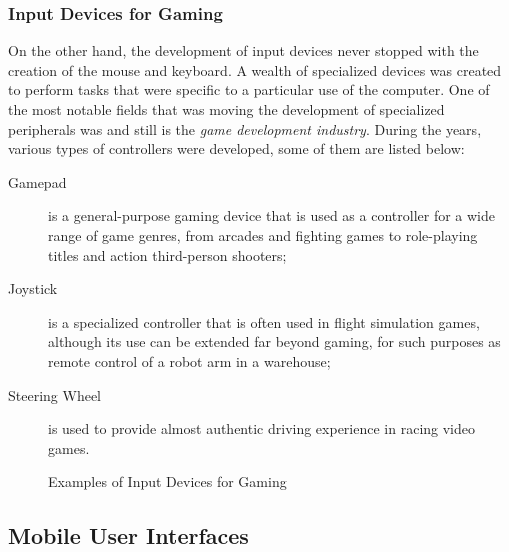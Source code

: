 \subsubsection{Input Devices for Gaming}

On the other hand, the development of input devices never stopped with the
creation of the mouse and keyboard. A wealth of specialized devices was
created to perform tasks that were specific to a particular use of the
computer. One of the most notable fields that was moving the development of
specialized peripherals was and still is the \emph{game development industry}.
During the years, various types of controllers were developed, some of them
are listed below:

\begin{description}

    \item [Gamepad] is a general-purpose gaming device that is used as a
        controller for a wide range of game genres, from arcades and fighting
        games to role-playing titles and action third-person shooters;

    \item [Joystick] is a specialized controller that is often used in flight
        simulation games, although its use can be extended far beyond gaming, for such
        purposes as remote control of a robot arm in a warehouse;

    \item [Steering Wheel] is used to provide almost authentic driving
        experience in racing video games.

\end{description}


\begin{figure}[!ht]
    \centering
    \caption{Examples of Input Devices for Gaming}
\end{figure}



\subsection{Mobile User Interfaces}

